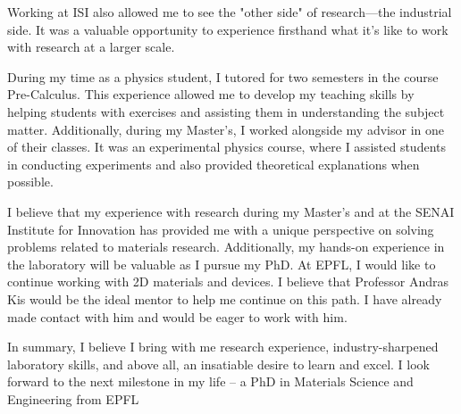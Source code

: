 \documentclass{article}
\begin{document}
Working at ISI also allowed me to see the "other side" of research—the industrial side. It was a valuable opportunity to experience firsthand what it’s like to work with research at a larger scale.




During my time as a physics student, I tutored for two semesters in the course Pre-Calculus. This experience allowed me to develop my teaching skills by helping students with exercises and assisting them in understanding the subject matter. Additionally, during my Master's, I worked alongside my advisor in one of their classes. It was an experimental physics course, where I assisted students in conducting experiments and also provided theoretical explanations when possible.



I believe that my experience with research during my Master's and at the SENAI Institute for Innovation has provided me with a unique perspective on solving problems related to materials research. Additionally, my hands-on experience in the laboratory will be valuable as I pursue my PhD. At EPFL, I would like to continue working with 2D materials and devices. I believe that Professor Andras Kis would be the ideal mentor to help me continue on this path. I have already made contact with him and would be eager to work with him.


In summary, I believe I bring with me research experience, industry-sharpened laboratory skills, and above all, an insatiable desire to learn and excel. I look forward to the next milestone in my life -- a PhD in Materials Science and Engineering from EPFL 

\vspace{0.125in}


\end{document}
